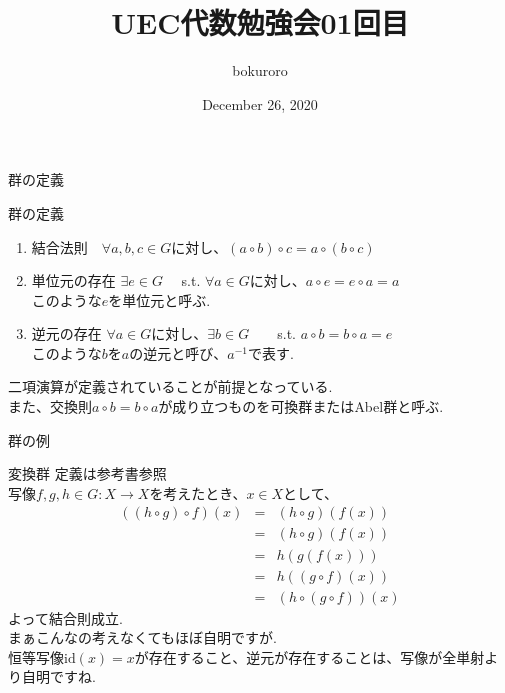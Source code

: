 \documentclass[dvipdfmx,11pt,notheorems]{beamer}
\title{UEC代数勉強会01回目}
\author{bokuroro}
\date{December 26, 2020}
\begin{document}
\maketitle
\begin{frame}{群の定義}
  \begin{block}{群の定義}
  \begin{enumerate}
   \item 結合法則　$\forall a,b,c \in G$に対し、$(a\circ b)\circ c=a\circ(b\circ c)$
   \item 単位元の存在 $\exists e \in G$　 s.t.  $\forall a \in G$に対し、$a\circ e=e\circ a=a$\\
   このような$e$を\alert{単位元}と呼ぶ.
   \item 逆元の存在 $\forall a \in G$に対し、$\exists b \in G$　　s.t.  $a\circ b = b\circ a=e$\\
   このような$b$を$a$の\alert{逆元}と呼び、$a^{-1}$で表す.
  \end{enumerate}
\end{block}
  \alert{二項演算}が定義されていることが前提となっている.\\
  また、交換則$a\circ b=b\circ a$が成り立つものを\alert{可換群}または\alert{Abel群}と呼ぶ.
\end{frame}
\begin{frame}{群の例}
  \begin{exampleblock}{変換群}
    定義は参考書参照\\
    写像$f,g,h \in G: X \rightarrow X$を考えたとき、$x \in X$として、
    \begin{eqnarray*}
      ((h\circ g)\circ f)(x) &=& (h\circ g)(f(x))\\
      &=&(h\circ g)(f(x))\\
      &=&h(g(f(x)))\\
      &=& h((g\circ f)(x))\\
      &=& (h\circ (g\circ f))(x)
    \end{eqnarray*}
    よって結合則成立. \\
    まぁこんなの考えなくてもほぼ自明ですが. \\
    恒等写像$\mathrm{id}(x)=x$が存在すること、逆元が存在することは、写像が全単射より自明ですね.
  \end{exampleblock}
\end{frame}
\end{document}
